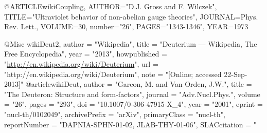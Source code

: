 @ARTICLE{wikiCoupling,
   AUTHOR="D.J. Gross and F. Wilczek", 
   TITLE="Ultraviolet behavior of non-abelian gauge theories",
   JOURNAL=Phys. Rev. Lett.,
   VOLUME=30,   
   number="26",
   PAGES="1343-1346",
   YEAR=1973  
}

@Misc{ wikiDeut2,
  author = "Wikipedia",
  title = "Deuterium --- {W}ikipedia{,} The Free Encyclopedia",
  year = "2013",
  howpublished = "\url{http://en.wikipedia.org/wiki/Deuterium}",
  url = "http://en.wikipedia.org/wiki/Deuterium",
  note = "[Online; accessed 22-Sep-2013]"
}	
@article{wikiDeut,
      author         = "Garcon, M. and Van Orden, J.W.",
      title          = "{The Deuteron: Structure and form-factors}",
      journal        = "Adv.Nucl.Phys.",
      volume         = "26",
      pages          = "293",
      doi            = "10.1007/0-306-47915-X_4",
      year           = "2001",
      eprint         = "nucl-th/0102049",
      archivePrefix  = "arXiv",
      primaryClass   = "nucl-th",
      reportNumber   = "DAPNIA-SPHN-01-02, JLAB-THY-01-06",
      SLACcitation   = "%
}

